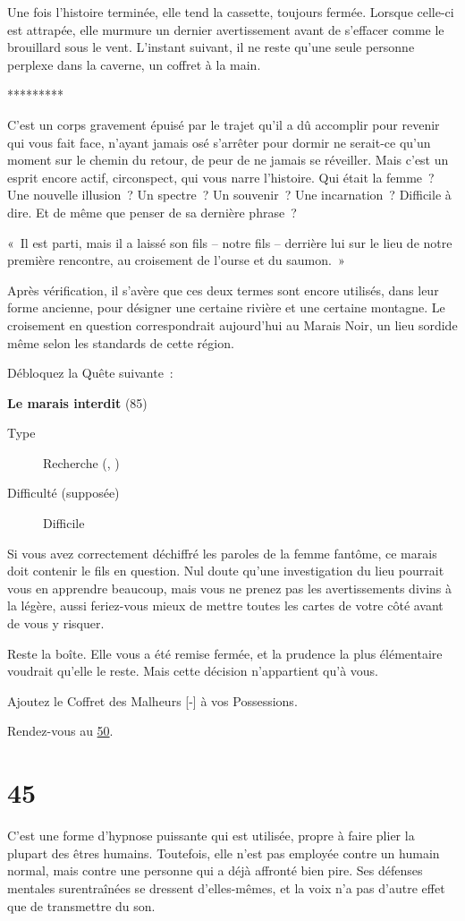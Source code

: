 \documentclass{report}
\newcommand{\gsection}[1]{
    \section{#1}
    \label{section-#1}
}
\newcommand{\glink}[1]{\hyperref[section-#1]{#1}}
\newcommand{\quest}[5]{
    \begin{mdframed}[innertopmargin=0.5cm,innerbottommargin=0.5cm,leftmargin=0.5cm,rightmargin=0.5cm]
        \begin{center}
            \textbf{#1} (#2)
        \end{center}
        \begin{description}
            \item[Type] #3
            \item[Difficulté (supposée)] #4
        \end{description}
        #5
    \end{mdframed}
}
\newcommand{\ellipse}{
    \begin{center}
        *********
    \end{center}
}
\begin{document}
Une fois l'histoire terminée, elle tend la cassette, toujours fermée. Lorsque celle-ci est attrapée, elle murmure un dernier avertissement avant de s'effacer comme le brouillard sous le vent. L'instant suivant, il ne reste qu'une seule personne perplexe dans la caverne, un coffret à la main.

\ellipse

C'est un corps gravement épuisé par le trajet qu'il a dû accomplir pour revenir qui vous fait face, n'ayant jamais osé s'arrêter pour dormir ne serait-ce qu'un moment sur le chemin du retour, de peur de ne jamais se réveiller. Mais c'est un esprit encore actif, circonspect, qui vous narre l'histoire. Qui était la femme ? Une nouvelle illusion ? Un spectre ? Un souvenir ? Une incarnation ? Difficile à dire. Et de même que penser de sa dernière phrase ?

« Il est parti, mais il a laissé son fils – notre fils – derrière lui sur le lieu de notre première rencontre, au croisement de l'ourse et du saumon. »

Après vérification, il s'avère que ces deux termes sont encore utilisés, dans leur forme ancienne, pour désigner une certaine rivière et une certaine montagne. Le croisement en question correspondrait aujourd'hui au Marais Noir, un lieu sordide même selon les standards de cette région.

Débloquez la Quête suivante :

\quest{Le marais interdit}{85}{Recherche (\ankh, \caduceus)}{Difficile}{
Si vous avez correctement déchiffré les paroles de la femme fantôme, ce marais doit contenir le fils en question. Nul doute qu'une investigation du lieu pourrait vous en apprendre beaucoup, mais vous ne prenez pas les avertissements divins à la légère, aussi feriez-vous mieux de mettre toutes les cartes de votre côté avant de vous y risquer.
}

Reste la boîte. Elle vous a été remise fermée, et la prudence la plus élémentaire voudrait qu'elle le reste. Mais cette décision n'appartient qu'à vous.

Ajoutez le Coffret des Malheurs [-] à vos Possessions. 

Rendez-vous au \glink{50}.

\gsection{45}

C'est une forme d'hypnose puissante qui est utilisée, propre à faire plier la plupart des êtres humains. Toutefois, elle n'est pas employée contre un humain normal, mais contre une personne qui a déjà affronté bien pire. Ses défenses mentales surentraînées se dressent d'elles-mêmes, et la voix n'a pas d'autre effet que de transmettre du son.
\end{document}

